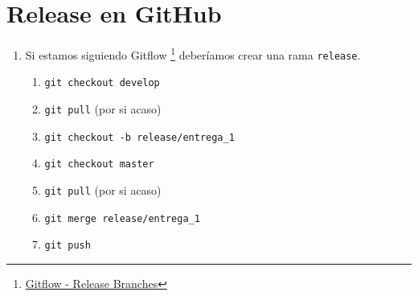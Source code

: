 \documentclass[12pt,a4paper]{article}
\begin{document}
\section{Release en GitHub}
\begin{enumerate}
	\item Si estamos siguiendo Gitflow \footnote{\href{https://www.atlassian.com/git/tutorials/comparing-workflows/gitflow-workflow}{Gitflow - Release Branches}} deberíamos crear una rama \texttt{release}.  
	\begin{enumerate}
		\item \texttt{git checkout develop}
		\item \texttt{git pull} (por si acaso)
		\item \texttt{git checkout -b release/entrega\_1}
		\item \texttt{git checkout master}
		\item \texttt{git pull} (por si acaso)
		\item \texttt{git merge release/entrega\_1}
		\item \texttt{git push}
	\end{enumerate}
	

\end{enumerate}
\end{document}
